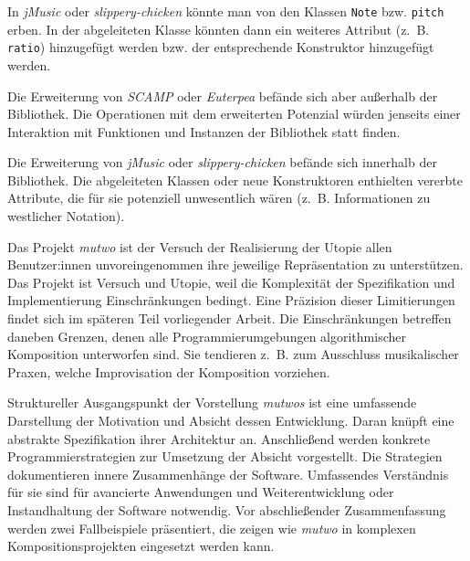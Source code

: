 \documentclass[12pt,a4paper,ngerman]{article}
\begin{document}
In \emph{jMusic} oder \emph{slippery-chicken} könnte man von den Klassen \texttt{Note} bzw. \texttt{pitch} erben.
In der abgeleiteten Klasse könnten dann ein weiteres Attribut (z.~B. \texttt{ratio}) hinzugefügt werden bzw. der entsprechende Konstruktor hinzugefügt werden.

\smallskip

Die Erweiterung von \emph{SCAMP} oder \emph{Euterpea} befände sich aber außerhalb der Bibliothek.
Die Operationen mit dem erweiterten Potenzial würden jenseits einer Interaktion mit Funktionen und Instanzen der Bibliothek statt finden.

\smallskip

Die Erweiterung von \emph{jMusic} oder \emph{slippery-chicken} befände sich innerhalb der Bibliothek.
Die abgeleiteten Klassen oder neue Konstruktoren enthielten vererbte Attribute, die für sie potenziell unwesentlich wären (z.~B. Informationen zu westlicher Notation).

\bigskip

Das Projekt \emph{mutwo} ist der Versuch der Realisierung der Utopie allen Benutzer:innen unvoreingenommen ihre jeweilige Repräsentation zu unterstützen.
Das Projekt ist Versuch und Utopie, weil die Komplexität der Spezifikation und Implementierung Einschränkungen bedingt.
Eine Präzision dieser Limitierungen findet sich im späteren Teil vorliegender Arbeit.
Die Einschränkungen betreffen daneben Grenzen, denen alle Programmierumgebungen algorithmischer Komposition unterworfen sind.
Sie tendieren z.~B. zum Ausschluss musikalischer Praxen, welche Improvisation der Komposition vorziehen.

\bigskip



Struktureller Ausgangspunkt der Vorstellung \emph{mutwos} ist eine umfassende Darstellung der Motivation und Absicht dessen Entwicklung.
Daran knüpft eine abstrakte Spezifikation ihrer Architektur an.
Anschließend werden konkrete Programmierstrategien zur Umsetzung der Absicht vorgestellt.
Die Strategien dokumentieren innere Zusammenhänge der Software.
Umfassendes Verständnis für sie sind für avancierte Anwendungen und Weiterentwicklung oder Instandhaltung der Software notwendig.
Vor abschließender Zusammenfassung werden zwei Fallbeispiele präsentiert, die zeigen wie \emph{mutwo} in komplexen Kompositionsprojekten eingesetzt werden kann.
\end{document}
